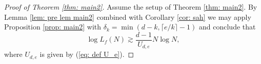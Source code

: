 \documentclass[alphabetic]{amsart}
\theoremstyle{definition}
\newtheorem{rem}[claim]{Remark}
\numberwithin{equation}{section}
\numberwithin{equation}{section}
\begin{document}


\begin{proof}[Proof of Theorem \ref{thm: main2}] Assume the setup of Theorem \ref{thm: main2}. By Lemma \ref{lem: pre lem main2} combined with Corollary \ref{cor: sah} we may apply Proposition \ref{prop: main2} with $\delta_k=\min(d-k,\lceil e/k\rceil-1)$ and conclude that
$$\log L_f(N)\gtrsim \frac{d-1}{U_{d,e}}N\log N,$$
where $U_{d,e}$ is given by (\ref{eq: def U_e}). \end{proof}




\end{document}
